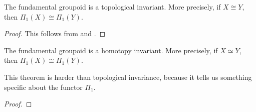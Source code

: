 \begin{cor}\label{fundamental groupoid is topological}
	The fundamental groupoid is a topological invariant. More precisely, if $X\cong Y$, then $\Pi_1(X)\cong \Pi_1(Y)$.
\end{cor}

\begin{proof}
	This follows from  and .
\end{proof}

\begin{thm}\label{fundamental groupoid is homotopy invariant}
	The fundamental groupoid is a homotopy invariant. More precisely, if $X\simeq Y$, then $\Pi_1(X)\cong \Pi_1(Y)$.
\end{thm}

This theorem is harder than topological invariance, because it tells us something specific about the functor $\Pi_1$.

\begin{proof}

\end{proof}

